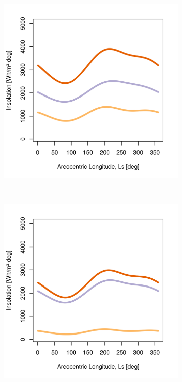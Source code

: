 \begin{figure}[h]
\begin{subfigure}[t]{\subfigureWidth}
  		\includegraphics[height=\graphicsHeight]{sections/martian-environment/plots/hh-hbh-and-hdh-as-a-function-of-ls-for-tau1-phi205-and-albedo-027}
  		\label{fig:sub:insolation-ls-tau-factor-1}
  	\end{subfigure}\\[0.8ex]
    \begin{subfigure}[t]{\subfigureWidth}
      \centering
  		\includegraphics[height=\graphicsHeight]{sections/martian-environment/plots/hh-hbh-and-hdh-as-a-function-of-ls-for-tau2-phi205-and-albedo-027}

\end{subfigure}
\end{figure}
